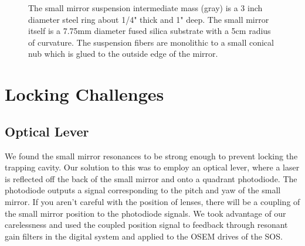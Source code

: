\begin{figure}[hb]
\label{fig:smallsus}
\centering
{}
\caption[Small Mirror Suspension]{The small mirror suspension intermediate
         mass (gray) is a 3 inch diameter steel ring about 1/4" thick and 1"
         deep. The small mirror itself is a 7.75mm diameter fused silica
         substrate with a 5cm radius of curvature. The suspension fibers are
         monolithic to a small conical nub which is glued to the outside edge
         of the mirror.}
\end{figure}



\section{Locking Challenges}

\subsection{Optical Lever}
We found the small mirror resonances to be strong enough to prevent locking the
trapping cavity. Our solution to this was to employ an optical lever, where a
laser is reflected off the back of the small mirror and onto a quadrant
photodiode. The photodiode outputs a signal corresponding to the pitch and yaw
of the small mirror. If you aren't careful with the position of lenses, there
will be a coupling of the small mirror position to the photodiode signals.
We took advantage of our carelessness and used the coupled position signal
to feedback through resonant gain filters in the digital system and applied to
the OSEM drives of the SOS.

